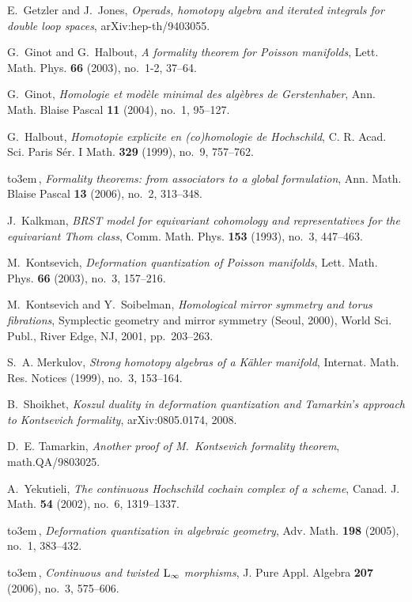 \documentclass{amsart}
\numberwithin{equation}{section}
\theoremstyle{definition}
\theoremstyle{remark}
\begin{document}
\begin{thebibliography}{10}
E.~Getzler and J.~Jones, {\em Operads, homotopy algebra and iterated integrals
  for double loop spaces}, arXiv:hep-th/9403055.

G.~Ginot and G.~Halbout, {\em A formality theorem for {P}oisson manifolds},
  Lett. Math. Phys. {\bf 66} (2003), no.~1-2, 37--64.

G.~Ginot, {\em Homologie et mod\`ele minimal des alg\`ebres de {G}erstenhaber},
  Ann. Math. Blaise Pascal {\bf 11} (2004), no.~1, 95--127.

G.~Halbout, {\em Homotopie explicite en (co)homologie de {H}ochschild}, C. R.
  Acad. Sci. Paris S\'er. I Math. {\bf 329} (1999), no.~9, 757--762.

{\leavevmode\hbox to3em{\hrulefill}\,}, {\em Formality theorems: from associators to a global formulation},
  Ann. Math. Blaise Pascal {\bf 13} (2006), no.~2, 313--348.

J.~Kalkman, {\em B{RST} model for equivariant cohomology and representatives
  for the equivariant {T}hom class}, Comm. Math. Phys. {\bf 153} (1993), no.~3,
  447--463.

M.~Kontsevich, {\em Deformation quantization of {P}oisson manifolds}, Lett.
  Math. Phys. {\bf 66} (2003), no.~3, 157--216.

M.~Kontsevich and Y.~Soibelman, {\em Homological mirror symmetry and torus
  fibrations}, Symplectic geometry and mirror symmetry ({S}eoul, 2000), World
  Sci. Publ., River Edge, NJ, 2001, pp.~203--263.

S.~A. Merkulov, {\em Strong homotopy algebras of a {K}\"ahler manifold},
  Internat. Math. Res. Notices (1999), no.~3, 153--164.

B.~Shoikhet, {\em Koszul duality in deformation quantization and {T}amarkin's
  approach to {K}ontsevich formality}, arXiv:0805.0174, 2008.

D.~E. Tamarkin, {\em Another proof of {M}.\ {K}ontsevich formality theorem},
  math.QA/9803025.

A.~Yekutieli, {\em The continuous {H}ochschild cochain complex of a scheme},
  Canad. J. Math. {\bf 54} (2002), no.~6, 1319--1337.

{\leavevmode\hbox to3em{\hrulefill}\,}, {\em Deformation quantization in algebraic geometry}, Adv. Math. {\bf
  198} (2005), no.~1, 383--432.

{\leavevmode\hbox to3em{\hrulefill}\,}, {\em Continuous and twisted {${\rm L}\sb \infty$} morphisms}, J. Pure
  Appl. Algebra {\bf 207} (2006), no.~3, 575--606.

\end{thebibliography}
\end{document}
